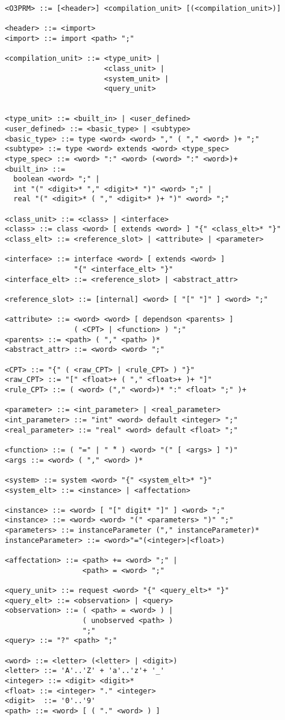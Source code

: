 \documentclass[12pt,a4paper]{article}
\begin{document}
\begin{footnotesize}
\begin{verbatim}
<O3PRM> ::= [<header>] <compilation_unit> [(<compilation_unit>)]

<header> ::= <import>
<import> ::= import <path> ";"

<compilation_unit> ::= <type_unit> |
                       <class_unit> |
                       <system_unit> |
                       <query_unit>


<type_unit> ::= <built_in> | <user_defined>
<user_defined> ::= <basic_type> | <subtype>
<basic_type> ::= type <word> <word> "," ( "," <word> )+ ";"
<subtype> ::= type <word> extends <word> <type_spec>
<type_spec> ::= <word> ":" <word> (<word> ":" <word>)+
<built_in> ::=
  boolean <word> ";" |
  int "(" <digit>* "," <digit>* ")" <word> ";" |
  real "(" <digit>* ( "," <digit>* )+ ")" <word> ";"

<class_unit> ::= <class> | <interface>
<class> ::= class <word> [ extends <word> ] "{" <class_elt>* "}"
<class_elt> ::= <reference_slot> | <attribute> | <parameter>

<interface> ::= interface <word> [ extends <word> ]
                "{" <interface_elt> "}"
<interface_elt> ::= <reference_slot> | <abstract_attr>

<reference_slot> ::= [internal] <word> [ "[" "]" ] <word> ";"

<attribute> ::= <word> <word> [ dependson <parents> ]
                ( <CPT> | <function> ) ";"
<parents> ::= <path> ( "," <path> )*
<abstract_attr> ::= <word> <word> ";"

<CPT> ::= "{" ( <raw_CPT> | <rule_CPT> ) "}"
<raw_CPT> ::= "[" <float>+ ( "," <float>+ )+ "]"
<rule_CPT> ::= ( <word> ("," <word>)* ":" <float> ";" )+

<parameter> ::= <int_parameter> | <real_parameter>
<int_parameter> ::= "int" <word> default <integer> ";"
<real_parameter> ::= "real" <word> default <float> ";"

<function> ::= ( "=" | " ̃" ) <word> "(" [ <args> ] ")"
<args ::= <word> ( "," <word> )*

<system> ::= system <word> "{" <system_elt>* "}"
<system_elt> ::= <instance> | <affectation>

<instance> ::= <word> [ "[" digit* "]" ] <word> ";"
<instance> ::= <word> <word> "(" <parameters> ")" ";"
<parameters> ::= instanceParameter ("," instanceParameter)*
instanceParameter> ::= <word>"="(<integer>|<float>)

<affectation> ::= <path> += <word> ";" |
                  <path> = <word> ";"

<query_unit> ::= request <word> "{" <query_elt>* "}"
<query_elt> ::= <observation> | <query>
<observation> ::= ( <path> = <word> ) |
                  ( unobserved <path> )
                  ";"
<query> ::= "?" <path> ";"

<word> ::= <letter> (<letter> | <digit>)
<letter> ::= 'A'..'Z' + 'a'..'z'+ '_'
<integer> ::= <digit> <digit>*
<float> ::= <integer> "." <integer>
<digit>  ::= '0'..'9'
<path> ::= <word> [ ( "." <word> ) ]

\end{verbatim}
\end{footnotesize}
\end{document}
